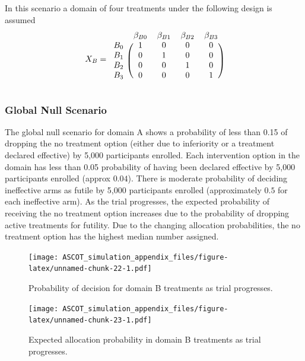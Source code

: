 \documentclass[
]{article}
\begin{document}
In this scenario a domain of four treatments under the following design is assumed
\[
 X_{B} = 
\begin{blockarray}{ccccc}
          & \beta_{B0} & \beta_{B1} & \beta_{B2} & \beta_{B3} \\
\begin{block}{r(cccc)}
      B_0 & 1 & 0 & 0 & 0 \\
      B_1 & 0 & 1 & 0 & 0 \\
      B_2 & 0 & 0 & 1 & 0 \\
      B_3 & 0 & 0 & 0 & 1 \\
\end{block}
\end{blockarray}
\]

\hypertarget{global-null-scenario-1}{%
\subsubsection{Global Null Scenario}\label{global-null-scenario-1}}

The global null scenario for domain A shows a probability of less than 0.15 of dropping the no treatment option (either due to inferiority or a treatment declared effective) by 5,000 participants enrolled.
Each intervention option in the domain has less than 0.05 probability of having been declared effective by 5,000 participants enrolled (approx \(0.04\)).
There is moderate probability of deciding ineffective arms as futile by 5,000 participants enrolled (approximately \(0.5\) for each ineffective arm).
As the trial progresses, the expected probability of receiving the no treatment option increases due to the probability of dropping active treatments for futility.
Due to the changing allocation probabilities, the no treatment option has the highest median number assigned.

\begin{figure}
\centering
\texttt{[image: ASCOT\_simulation\_appendix\_files/figure-latex/unnamed-chunk-22-1.pdf]}
\caption{\label{fig:unnamed-chunk-22}Probability of decision for domain B treatments as trial progresses.}
\end{figure}

\begin{figure}
\centering
\texttt{[image: ASCOT\_simulation\_appendix\_files/figure-latex/unnamed-chunk-23-1.pdf]}
\caption{\label{fig:unnamed-chunk-23}Expected allocation probability in domain B treatments as trial progresses.}
\end{figure}
\end{document}
